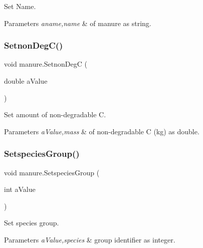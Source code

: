 Set Name. 


\begin{DoxyParams}{Parameters}
{\em aname,name} & of manure as string. \\
\hline
\end{DoxyParams}
\mbox{\label{classmanure_a60f964b149055fba3bc3e5f6af4f3939}} 
\subsubsection{\texorpdfstring{SetnonDegC()}{SetnonDegC()}}
{\footnotesize\ttfamily void manure.\+Setnon\+DegC (\begin{DoxyParamCaption}\item[{double}]{a\+Value }\end{DoxyParamCaption})\hspace{0.3cm}{\ttfamily [inline]}}



Set amount of non-\/degradable C. 


\begin{DoxyParams}{Parameters}
{\em a\+Value,mass} & of non-\/degradable C (kg) as double. \\
\hline
\end{DoxyParams}
\mbox{\label{classmanure_a5e54ba4bbadb3618b1c485d881f1b853}} 
\subsubsection{\texorpdfstring{SetspeciesGroup()}{SetspeciesGroup()}}
{\footnotesize\ttfamily void manure.\+Setspecies\+Group (\begin{DoxyParamCaption}\item[{int}]{a\+Value }\end{DoxyParamCaption})\hspace{0.3cm}{\ttfamily [inline]}}



Set species group. 


\begin{DoxyParams}{Parameters}
{\em a\+Value,species} & group identifier as integer. \\
\hline
\end{DoxyParams}
\mbox{\label{classmanure_aaab1b791c9378e7e88c59a157916fa79}} 
